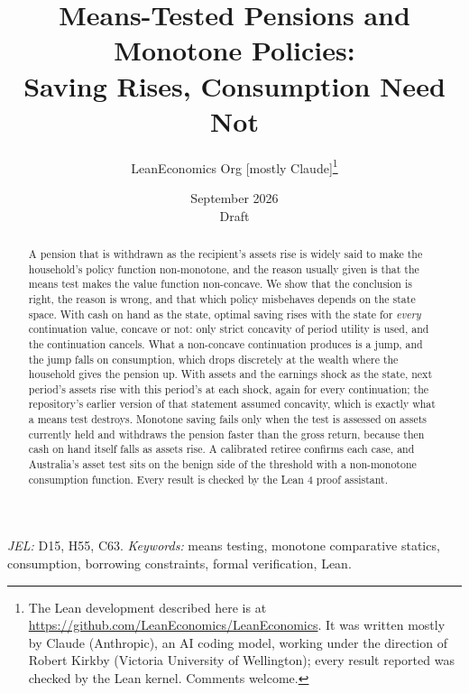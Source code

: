 \documentclass[11pt]{article}
\title{Means-Tested Pensions and Monotone Policies:\\ Saving Rises, Consumption Need Not}
\author{LeanEconomics Org [mostly Claude]\thanks{The Lean development described here is at
\url{https://github.com/LeanEconomics/LeanEconomics}. It was written mostly by Claude (Anthropic),
an AI coding model, working under the direction of Robert Kirkby (Victoria University of
Wellington); every result reported was checked by the Lean kernel. Comments welcome.}}
\date{September 2026\\[0.5em]\small Draft}
\theoremstyle{definition}
\theoremstyle{remark}
\begin{document}
\maketitle

\begin{abstract}
\noindent
A pension that is withdrawn as the recipient's assets rise is widely said to make the household's
policy function non-monotone, and the reason usually given is that the means test makes the value
function non-concave. We show that the conclusion is right, the reason is wrong, and that which
policy misbehaves depends on the state space. With cash on hand as the state, optimal saving rises
with the state for \emph{every} continuation value, concave or not: only strict concavity of
period utility is used, and the continuation cancels. What a non-concave continuation produces is
a jump, and the jump falls on consumption, which drops discretely at the wealth where the
household gives the pension up. With assets and the earnings shock as the state, next period's
assets rise with this period's at each shock, again for every continuation; the repository's
earlier version of that statement assumed concavity, which is exactly what a means test destroys.
Monotone saving fails only when the test is assessed on assets currently held and withdraws the
pension faster than the gross return, because then cash on hand itself falls as assets rise. A
calibrated retiree confirms each case, and Australia's asset test sits on the benign side of the
threshold with a non-monotone consumption function. Every result is checked by the Lean 4 proof
assistant.
\end{abstract}

\noindent\emph{JEL:} D15, H55, C63. \quad \emph{Keywords:} means testing, monotone comparative
statics, consumption, borrowing constraints, formal verification, Lean.











\appendix

\end{document}
